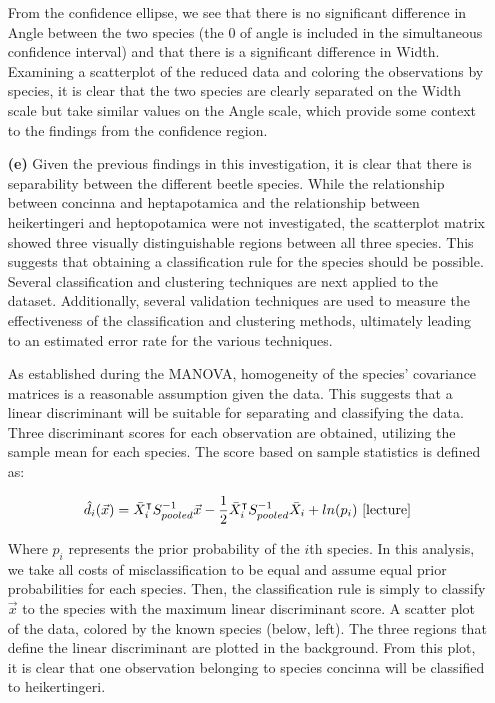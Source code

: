 \begin{enumerate}
	From the confidence ellipse, we see that there is no significant difference in Angle between the two species (the $0$ of angle is included in the simultaneous confidence interval) and that there is a significant difference in Width. Examining a scatterplot of the reduced data and coloring the observations by species, it is clear that the two species are clearly separated on the Width scale but take similar values on the Angle scale, which provide some context to the findings from the confidence region.

\newpage
\item[\bf{(e)}]
	Given the previous findings in this investigation, it is clear that there is separability between the different beetle species. While the relationship between concinna and heptapotamica and the relationship between heikertingeri and heptopotamica were not investigated, the scatterplot matrix showed three visually distinguishable regions between all three species. This suggests that obtaining a classification rule for the species should be possible. Several classification and clustering techniques are next applied to the dataset. Additionally, several validation techniques are used to measure the effectiveness of the classification and clustering methods, ultimately leading to an estimated error rate for the various techniques.

	As established during the MANOVA, homogeneity of the species' covariance matrices is a reasonable assumption given the data. This suggests that a linear discriminant will be suitable for separating and classifying the data. Three discriminant scores for each observation are obtained, utilizing the sample mean for each species. The score based on sample statistics is defined as:

	$$\hat{d_i}(\vec{x}) = \bar{X}_i^{\intercal} S_{pooled}^{-1} \vec{x} - \frac{1}{2} \bar{X}_i^{\intercal} S_{pooled}^{-1} \bar{X}_i + ln(p_i)\ \cite[Lecture~25]{lecture}$$

	Where $p_i$ represents the prior probability of the $i$th species. In this analysis, we take all costs of misclassification to be equal and assume equal prior probabilities for each species. Then, the classification rule is simply to classify $\vec{x}$ to the species with the maximum linear discriminant score. A scatter plot of the data, colored by the known species (below, left). The three regions that define the linear discriminant are plotted in the background. From this plot, it is clear that one observation belonging to species concinna will be classified to heikertingeri.


\end{enumerate}
